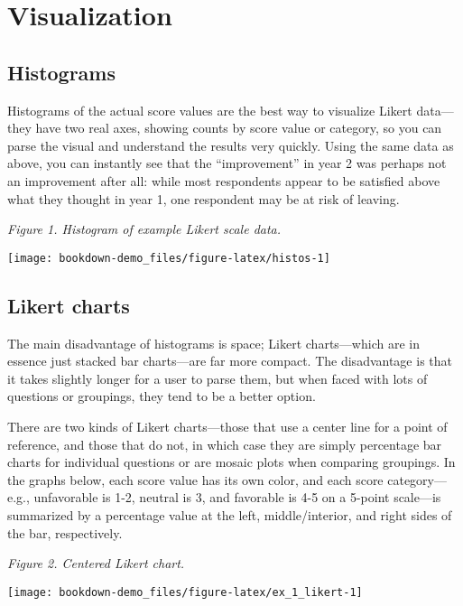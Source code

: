 \documentclass[]{book}
\begin{document}
\chapter{Visualization}\label{visualization}

\section{Histograms}\label{histograms}

Histograms of the actual score values are the best way to visualize
Likert data---they have two real axes, showing counts by score value or
category, so you can parse the visual and understand the results very
quickly. Using the same data as above, you can instantly see that the
``improvement'' in year 2 was perhaps not an improvement after all:
while most respondents appear to be satisfied above what they thought in
year 1, one respondent may be at risk of leaving.

\emph{Figure 1. Histogram of example Likert scale data.}

\begin{center}\texttt{[image: bookdown-demo\_files/figure-latex/histos-1]} \end{center}

\section{Likert charts}\label{likert-charts}

The main disadvantage of histograms is space; Likert charts---which are
in essence just stacked bar charts---are far more compact. The
disadvantage is that it takes slightly longer for a user to parse them,
but when faced with lots of questions or groupings, they tend to be a
better option.

There are two kinds of Likert charts---those that use a center line for
a point of reference, and those that do not, in which case they are
simply percentage bar charts for individual questions or are mosaic
plots when comparing groupings. In the graphs below, each score value
has its own color, and each score category---e.g., unfavorable is 1-2,
neutral is 3, and favorable is 4-5 on a 5-point scale---is summarized by
a percentage value at the left, middle/interior, and right sides of the
bar, respectively.

\emph{Figure 2. Centered Likert chart.}

\begin{center}\texttt{[image: bookdown-demo\_files/figure-latex/ex\_1\_likert-1]} \end{center}
\end{document}
